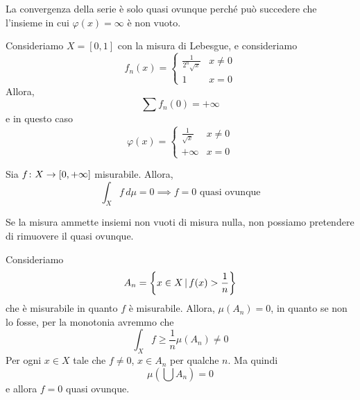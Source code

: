 \documentclass[a4paper]{article}
\begin{document}
\begin{radioactive}
La convergenza della serie è solo quasi ovunque perché può succedere che l'insieme in cui \(\varphi(x) = \infty\)
è non vuoto.
\end{radioactive}

\begin{radioactive}
\begin{snippetexample}{}
    Consideriamo \(X = [0,1]\) con la misura di Lebesgue, e consideriamo \[
        f_n(x) =
        \begin{cases}
            \frac{1}{2^n \sqrt{x}} & x \neq 0 \\
            1 & x = 0
        \end{cases}
    \]
    Allora, \[
        \sum f_n(0) = +\infty
    \]
    e in questo caso
    \[
        \varphi(x) =
        \begin{cases}
            \frac{1}{\sqrt x} & x \neq 0 \\
            +\infty & x=0
        \end{cases}
    \]
\end{snippetexample}
\end{radioactive}

\begin{radioactive}
\begin{snippettheorem}{}
    Sia \(f \colon X \to [0,+\infty]\)
    misurabile. Allora, \[
        \int_X f\,d\mu = 0 \implies f = 0 \text{ quasi ovunque}
    \]
\end{snippettheorem}
\end{radioactive}

\begin{radioactive}
Se la misura ammette insiemi non vuoti di misura nulla,
non possiamo pretendere di rimuovere il quasi ovunque.
\end{radioactive}

\begin{radioactive}
\begin{snippetproof}{}
    Consideriamo \[
        A_n = \left\{
            x \in X \,|\, f(x) > \frac 1n
        \right\}
    \]
    che è misurabile in quanto \(f\) è misurabile.
    Allora, \(\mu(A_n) = 0\), in quanto se non lo fosse,
    per la monotonia avremmo che \[
        \int_X f \geq \frac{1}{n}\mu(A_n) \neq 0
    \]
    Per ogni \(x \in X\) tale che \(f \neq 0\), \(x \in A_n\) per qualche \(n\).
    Ma quindi \[
        \mu\left(\bigcup A_n\right) = 0
    \]
    e allora \(f = 0\) quasi ovunque.
\end{snippetproof}
\end{radioactive}
\end{document}
